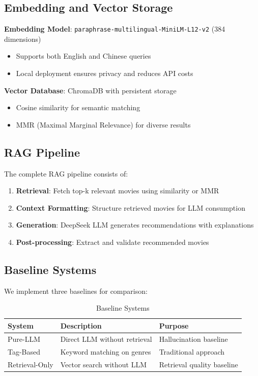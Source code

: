 \documentclass[11pt,a4paper]{article}
\begin{document}
\subsection{Embedding and Vector Storage}

\textbf{Embedding Model}: \texttt{paraphrase-multilingual-MiniLM-L12-v2} (384 dimensions)
\begin{itemize}
    \item Supports both English and Chinese queries
    \item Local deployment ensures privacy and reduces API costs
\end{itemize}

\textbf{Vector Database}: ChromaDB with persistent storage
\begin{itemize}
    \item Cosine similarity for semantic matching
    \item MMR (Maximal Marginal Relevance) for diverse results
\end{itemize}

\subsection{RAG Pipeline}

The complete RAG pipeline consists of:

\begin{enumerate}
    \item \textbf{Retrieval}: Fetch top-k relevant movies using similarity or MMR
    \item \textbf{Context Formatting}: Structure retrieved movies for LLM consumption
    \item \textbf{Generation}: DeepSeek LLM generates recommendations with explanations
    \item \textbf{Post-processing}: Extract and validate recommended movies
\end{enumerate}

\subsection{Baseline Systems}

We implement three baselines for comparison:

\begin{table}[h]
\centering
\begin{tabular}{lll}
\toprule
\textbf{System} & \textbf{Description} & \textbf{Purpose} \\
\midrule
Pure-LLM & Direct LLM without retrieval & Hallucination baseline \\
Tag-Based & Keyword matching on genres & Traditional approach \\
Retrieval-Only & Vector search without LLM & Retrieval quality baseline \\
\bottomrule
\end{tabular}
\caption{Baseline Systems}
\end{table}
\end{document}
